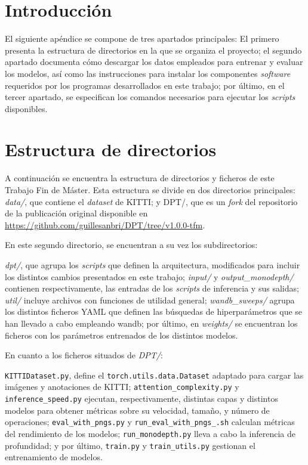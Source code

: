 \label{documentacion}

\section{Introducción}
El siguiente apéndice se compone de tres apartados principales: El primero presenta la estructura de directorios en la que se organiza el proyecto; el segundo apartado documenta cómo descargar los datos empleados para entrenar y evaluar los modelos, así como las instrucciones para instalar los componentes \textit{software} requeridos por los programas desarrollados en este trabajo; por último, en el tercer apartado, se especifican los comandos necesarios para ejecutar los \textit{scripts} disponibles.

\section{Estructura de directorios}

A continuación se encuentra la estructura de directorios y ficheros de este Trabajo Fin de Máster. Esta estructura se divide en dos directorios principales: \textit{data/}, que contiene el \textit{dataset} de KITTI; y DPT/, que es un \textit{fork} del repositorio de la publicación original \cite{visiontransformersDPT} disponible en \url{https://github.com/guillesanbri/DPT/tree/v1.0.0-tfm}.

En este segundo directorio, se encuentran a su vez los subdirectorios: 

\textit{dpt/}, que agrupa los \textit{scripts} que definen la arquitectura, modificados para incluir los distintos cambios presentados en este trabajo; \textit{input/} y \textit{output{\_}monodepth/} contienen respectivamente, las entradas de los \textit{scripts} de inferencia y sus salidas; \textit{util/} incluye archivos con funciones de utilidad general; \textit{wandb{\_}sweeps/} agrupa los distintos ficheros YAML que definen las búsquedas de hiperparámetros que se han llevado a cabo empleando wandb; por último, en \textit{weights/} se encuentran los ficheros con los parámetros entrenados de los distintos modelos.

En cuanto a los ficheros situados de \textit{DPT/}: 

\texttt{KITTIDataset.py}, define el \texttt{torch.utils.data.Dataset} adaptado para cargar las imágenes y anotaciones de KITTI; \texttt{attention{\_}complexity.py} y \texttt{inference{\_}speed.py} ejecutan, respectivamente, distintas capas y distintos modelos para obtener métricas sobre su velocidad, tamaño, y número de operaciones; \texttt{eval{\_}with{\_}pngs.py} y \texttt{run{\_}eval{\_}with{\_}pngs{\_}.sh} calculan métricas del rendimiento de los modelos; \texttt{run{\_}monodepth.py} lleva a cabo la inferencia de profundidad; y por último, \texttt{train.py} y \texttt{train{\_}utils.py} gestionan el entrenamiento de modelos.

